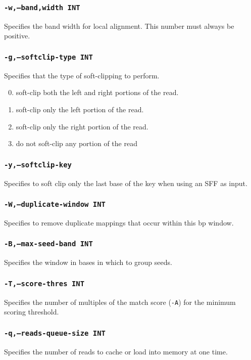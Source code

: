 \documentclass[a4paper,12pt]{book}
\newcommand{\TT}[1]{{\tt #1}} %
\begin{document}
\subsubsection{\TT{-w,--band,width INT}}
Specifies the band width for local alignment.
This number must always be positive.

\subsubsection{\TT{-g,--softclip-type INT}}
Specifies that the type of soft-clipping to perform.
\begin{enumerate}
	\setcounter{enumi}{-1} %
	\item soft-clip both the left and right portions of the read.
	\item soft-clip only the left portion of the read.
	\item soft-clip only the right portion of the read.
	\item do not soft-clip any portion of the read
\end{enumerate}

\subsubsection{\TT{-y,--softclip-key}}
Specifies to soft clip only the last base of the key when using an SFF as input.

\subsubsection{\TT{-W,--duplicate-window INT}}
Specifies to remove duplicate mappings that occur within this bp window.

\subsubsection{\TT{-B,--max-seed-band INT}}
Specifies the window in bases in which to group seeds.

\subsubsection{\TT{-T,--score-thres INT}}
Specifies the number of multiples of the match score (\TT{-A}) for the minimum scoring threshold.

\subsubsection{\TT{-q,--reads-queue-size INT}}
Specifies the number of reads to cache or load into memory at one time.
\end{document}
